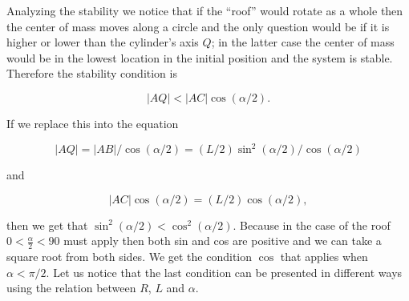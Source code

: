 \documentclass[11pt]{article}
\begin{document}
{Analyzing the stability we notice that if the “roof” would rotate as a whole then the center of mass moves along a circle and the only question would be if it is higher or lower than the cylinder’s axis $Q$; in the latter case the center of mass would be in the lowest location in the initial position and the system is stable. Therefore the stability condition is

$$|AQ|<|AC|\cos(\alpha/2).$$

If we replace this into the equation

$$|AQ|=|AB|/\cos(\alpha/2)=(L/2)\sin^2(\alpha/2)/\cos(\alpha/2)$$

and 

$$|AC|\cos(\alpha/2)=(L/2)\cos(\alpha/2),$$

then we get that $\sin^2(\alpha /2) < \cos ^2(\alpha /2)$. Because in the case of the roof $0<\frac{\alpha}{2}<90$ must apply then both sin and cos are positive and we can take a square root from both sides. We get the condition $\cos$ that applies when $\alpha<\pi/2$. Let us notice that the last condition can be presented in different ways using the relation between $R$, $L$ and $\alpha$.
\fi
}
\end{document}
